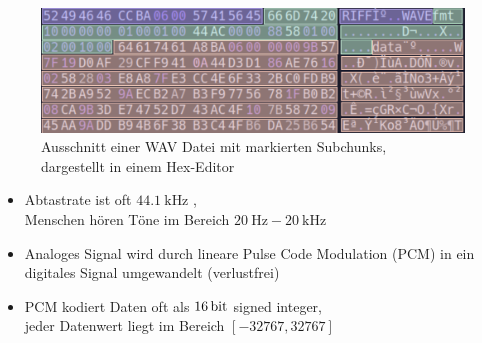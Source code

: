 \begin{frame}{\insertsection}
	\begin{figure}
		\includegraphics[scale=0.125]{images/wav_hex.png}
		\caption{\centering Ausschnitt einer WAV Datei mit markierten Subchunks,\\dargestellt in einem Hex-Editor}
	\end{figure}
	\begin{itemize}
		\item Abtastrate ist oft $\SI{44.1}{\kilo\hertz}$ ,
		\\  Menschen hören Töne im Bereich $\SI{20}{\hertz}-\SI{20}{\kilo\hertz}$ 
		\item Analoges Signal wird durch lineare Pulse Code Modulation (PCM)  in ein digitales Signal umgewandelt (verlustfrei)
		\item PCM kodiert Daten oft als $\SI{16}{\bit}$ signed integer,
		\\ jeder Datenwert liegt im Bereich $[-32767, 32767]$
	\end{itemize}
\end{frame}